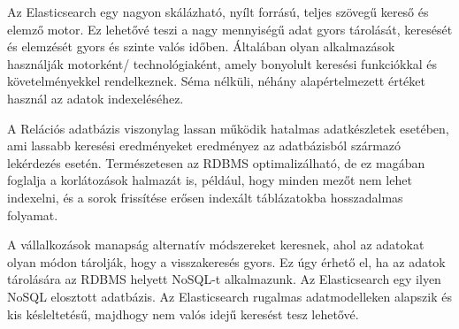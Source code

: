 
Az Elasticsearch egy nagyon skálázható, nyílt forrású, teljes szövegű kereső és elemző motor. Ez lehetővé teszi a nagy mennyiségű adat gyors tárolását, keresését és elemzését gyors és szinte valós időben. Általában olyan alkalmazások használják motorként/ technológiaként, amely bonyolult keresési funkciókkal és követelményekkel rendelkeznek. Séma nélküli, néhány alapértelmezett értéket használ az adatok indexeléséhez.

A Relációs adatbázis viszonylag lassan működik hatalmas adatkészletek esetében, ami lassabb keresési eredményeket eredményez az adatbázisból származó lekérdezés esetén. Természetesen az RDBMS optimalizálható, de ez magában foglalja a korlátozások halmazát is, például, hogy minden mezőt nem lehet indexelni, és a sorok frissítése erősen indexált táblázatokba hosszadalmas folyamat.

A vállalkozások manapság alternatív módszereket keresnek, ahol az adatokat olyan módon tárolják, hogy a visszakeresés gyors. Ez úgy érhető el, ha az adatok tárolására az RDBMS helyett NoSQL-t alkalmazunk. Az Elasticsearch egy ilyen NoSQL elosztott adatbázis. Az Elasticsearch rugalmas adatmodelleken alapszik és kis késleltetésű, majdhogy nem valós idejű keresést tesz lehetővé.

